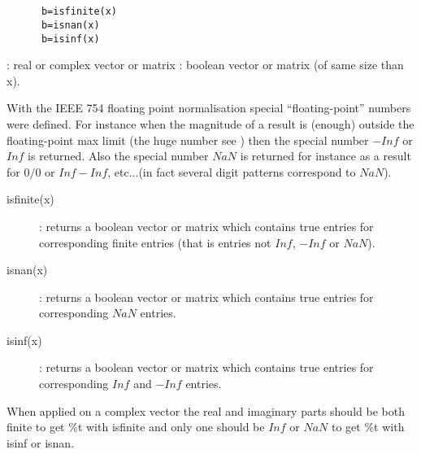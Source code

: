 

\begin{mandesc}
\\
\\
\end{mandesc}

\begin{calling_sequence}
    \begin{verbatim}
      b=isfinite(x)  
      b=isnan(x)  
      b=isinf(x)  
    \end{verbatim}
\end{calling_sequence}


\begin{parameters}
  \begin{varlist}
   : real or complex vector or matrix
   : boolean vector or matrix (of same size than x).
  \end{varlist}
\end{parameters}

\begin{mandescription}
With the IEEE 754 floating point normalisation special
``floating-point'' numbers were defined. For instance 
when the magnitude of a result is (enough) outside the
floating-point max limit (the huge number see 
) then
the special number $-Inf$ or $Inf$ is returned. Also
the special number $NaN$ is returned for instance
as a result for $0 / 0$ or $Inf - Inf$, etc...(in fact
several digit patterns correspond to $NaN$).     

\begin{description}
\item[isfinite(x)]: 
    returns a boolean vector or matrix which contains true
    entries for corresponding finite entries (that is entries
    not $Inf$, $-Inf$ or $NaN$).
\item[isnan(x)]: 
    returns a boolean vector or matrix which contains true
    entries for corresponding $NaN$ entries.
\item[isinf(x)]: 
    returns a boolean vector or matrix which contains true
    entries for corresponding $Inf$ and $-Inf$ entries.
\end{description}

When applied on a complex vector the real and imaginary parts should
be both finite to get \%t with isfinite and only one should be $Inf$
or $NaN$ to get \%t with isinf or isnan. 
  
\end{mandescription}


\begin{examples}

\begin{program}
\end{program}

\end{examples}

\begin{manseealso}
\end{manseealso}


